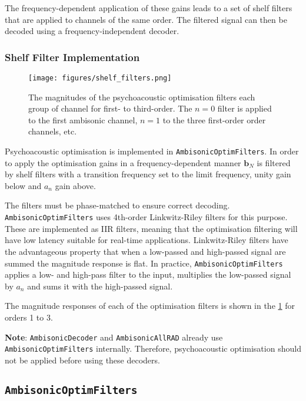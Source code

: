 \documentclass[12pt]{report}
\newcommand{\code}[1]{\texttt{#1}}
\begin{document}
The frequency-dependent application of these gains leads to a set of shelf filters that are applied to channels of the same order.
The filtered signal can then be decoded using a frequency-independent decoder.

\subsubsection{Shelf Filter Implementation}

\begin{figure}
    \centering
    \texttt{[image: figures/shelf\_filters.png]}
    \caption{The magnitudes of the psychoacoustic optimisation filters each group of channel for first- to third-order. The $n = 0$ filter is applied to the first ambisonic channel, $n = 1$ to the three first-order order channels, etc.}
    \label{fig:shelf_filters}
\end{figure}

Psychoacoustic optimisation is implemented in \code{AmbisonicOptimFilters}.
In order to apply the optimisation gains in a frequency-dependent manner $\textbf{b}_{N}$ is filtered by shelf filters with a transition frequency set to the limit frequency, unity gain below and $a_{n}$ gain above.

The filters must be phase-matched to ensure correct decoding.
\code{AmbisonicOptimFilters} uses 4th-order Linkwitz-Riley filters for this purpose.
These are implemented as IIR filters, meaning that the optimisation filtering will have low latency suitable for real-time applications.
Linkwitz-Riley filters have the advantageous property that when a low-passed and high-passed signal are summed the magnitude response is flat.
In practice, \code{AmbisonicOptimFilters} applies a low- and high-pass filter to the input, multiplies the low-passed signal by $a_{n}$ and sums it with the high-passed signal.

The magnitude responses of each of the optimisation filters is shown in the \cref{fig:shelf_filters} for orders 1 to 3.

\textbf{Note}: \code{AmbisonicDecoder} and \code{AmbisonicAllRAD} already use \code{AmbisonicOptimFilters} internally. Therefore, psychoacoustic optimisation should not be applied before using these decoders.

\subsection{\code{AmbisonicOptimFilters}}
\end{document}
